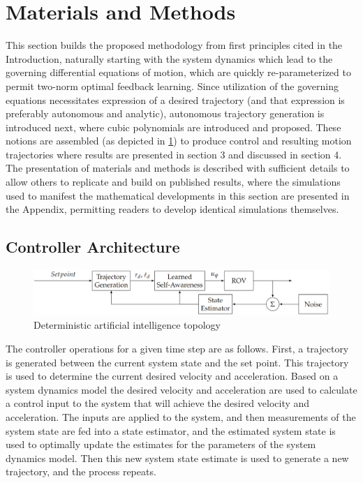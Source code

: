 \documentclass[applsci,article,submit,pdftex,moreauthors]{Definitions/mdpi}
\begin{document}
\section{Materials and Methods}
This section builds the proposed methodology from first principles cited in the Introduction, naturally starting with the system dynamics which lead to the governing differential equations of motion, which are quickly re-parameterized to permit two-norm optimal feedback learning. Since utilization of the governing equations necessitates expression of a desired trajectory (and that expression is preferably autonomous and analytic), autonomous trajectory generation is introduced next, where cubic polynomials are introduced and proposed. These notions are assembled (as depicted in \ref{fig:DAItopology}) to produce control and resulting motion trajectories where results are presented in section 3 and discussed in section 4. The presentation of materials and methods is described with sufficient details to allow others to replicate and build on published results, where the simulations used to manifest the mathematical developments in this section are presented in the Appendix, permitting readers to develop identical simulations themselves.

\subsection{Controller Architecture} 

\begin{figure}[h]
  \widefigure
\includegraphics[width=13.5cm]{DAItopology.png}
\caption{Deterministic artificial intelligence topology}
\label{fig:DAItopology}
\end{figure}

The controller operations for a given time step are as follows. First, a trajectory is generated between the current system state and the set point. This trajectory is used to determine the current desired velocity and acceleration. Based on a system dynamics model the desired velocity and acceleration are used to calculate a control input to the system that will achieve the desired velocity and acceleration. The inputs are applied to the system, and then measurements of the system state are fed into a state estimator, and the estimated system state is used to optimally update the estimates for the parameters of the system dynamics model. Then this new system state estimate is used to generate a new trajectory, and the process repeats.
\end{document}
